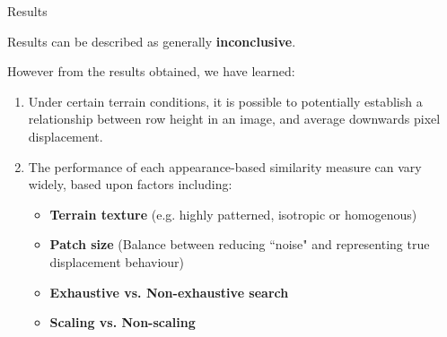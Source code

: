 \documentclass[10pt, compress]{beamer}
\begin{document}
\begin{frame}{Results}

Results can be described as generally \textbf{inconclusive}. \\ \vspace{0.5cm}

However from the results obtained, we have learned:

\begin{enumerate}[label={\arabic*.}]
  \item Under certain terrain conditions, it is possible to potentially establish a relationship between row height in an image, and average downwards pixel displacement. \vspace{0.5cm} 
  \item The performance of each appearance-based similarity measure can vary widely, based upon factors including:
 \vspace{0.2cm} 
  \begin{itemize}[label={\textbullet}]
  	\item \textbf{Terrain texture} (e.g. highly patterned, isotropic or homogenous)
  	\item \textbf{Patch size} (Balance between reducing ``noise" and representing true displacement behaviour)
  	\item \textbf{Exhaustive vs. Non-exhaustive search}
  	\item \textbf{Scaling vs. Non-scaling}
  \end{itemize}
\end{enumerate}

\end{frame}
\end{document}
